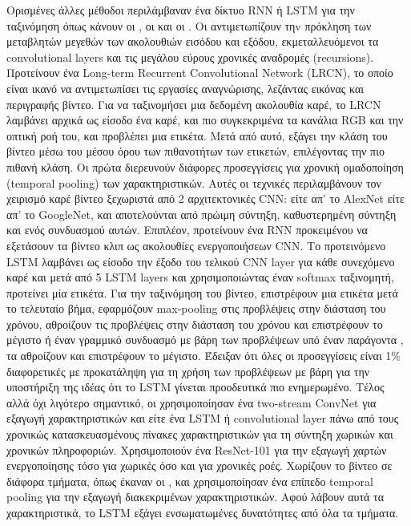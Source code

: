 Ορισμένες άλλες μέθοδοι περιλάμβαναν ένα δίκτυο \en RNN \gr  ή  \en LSTM  \gr για την ταξινόμηση όπως κάνουν οι \en\cite{DBLP:journals/corr/DonahueHGRVSD14}\gr, οι \en \cite{DBLP:journals/corr/NgHVVMT15} \gr
και οι \en \cite{DBLP:journals/corr/MaCKA17}\gr. Οι  \en \cite{DBLP:journals/corr/DonahueHGRVSD14} \gr αντιμετωπίζουν τηv  πρόκληση των μεταβλητών μεγεθών των ακολουθιών εισόδου και εξόδου,
εκμεταλλευόμενοι τα \en convolutional layers \gr  και τις μεγάλου εύρους χρονικές αναδρομές (\en recursions\gr). Προτείνουν ένα \en Long-term Recurrent
Convolutional Network (LRCN)\gr, το οποίο είναι ικανό να αντιμετωπίσει  τις εργασίες αναγνώρισης, λεζάντας εικόνας και περιγραφής βίντεο.
Για να ταξινομήσει μια δεδομένη ακολουθία καρέ, το \en LRCN \gr λαμβάνει αρχικά ως είσοδο ένα καρέ, και πιο συγκεκριμένα τα κανάλια \en RGB \gr και την οπτική ροή του, και προβλέπει μια ετικέτα.
Μετά από αυτό, εξάγει την  κλάση  του βίντεο μέσω του  μέσου όρου των πιθανοτήτων των ετικετών, επιλέγοντας την πιο πιθανή κλάση.
Οι  \en\cite{DBLP:journals/corr/NgHVVMT15}  \gr πρώτα διερευνούν  διάφορες προσεγγίσεις για χρονική ομαδοποίηση (\en temporal pooling\gr) των χαρακτηριστικών.
Αυτές οι τεχνικές περιλαμβάνουν τον χειρισμό καρέ βίντεο ξεχωριστά από 2 αρχιτεκτονικές \en  CNN\gr: είτε απ' το \en AlexNet \gr είτε απ' το \en GoogleNet\gr, και αποτελούνται από 
πρώιμη σύντηξη, καθυστερημένη σύντηξη και  ενός συνδυασμού αυτών. Επιπλέον, προτείνουν ένα \en RNN \gr προκειμένου να εξετάσουν τα βίντεο κλιπ
ως ακολουθίες ενεργοποιήσεων \en CNN\gr. Το προτεινόμενο \en LSTM \gr λαμβάνει ως είσοδο την έξοδο του τελικού \en CNN layer \gr για κάθε συνεχόμενο καρέ και μετά από 5 \en LSTM layers \gr και χρησιμοποιώντας
έναν \en softmax \gr ταξινομητή, προτείνει μία ετικέτα. Για την ταξινόμηση του βίντεο,  επιστρέφουν μια ετικέτα μετά το τελευταίο βήμα, εφαρμόζουν \en max-pooling \gr στις προβλέψεις στην διάσταση
του χρόνου, αθροίζουν τις προβλέψεις στην διάσταση του χρόνου και επιστρέφουν το μέγιστο ή έναν γραμμικό συνδυασμό με βάρη των προβλέψεων υπό έναν παράγοντα , τα αθροίζουν και επιστρέφουν το μέγιστο.
Έδειξαν ότι όλες οι προσεγγίσεις είναι 1\% διαφορετικές με προκατάληψη για τη χρήση των προβλέψεων με βάρη 
για την υποστήριξη της ιδέας ότι το \en LSTM \gr γίνεται προοδευτικά πιο ενημερωμένο. Τέλος 
αλλά όχι λιγότερο σημαντικό, οι \en \cite{DBLP:journals/corr/MaCKA17} \gr χρησιμοποίησαν ένα \en two-stream ConvNet \gr για  εξαγωγή χαρακτηριστικών και είτε ένα \en
LSTM \gr ή  \en convolutional layer \gr πάνω από τους χρονικώς κατασκευασμένους πίνακες χαρακτηριστικών για τη σύντηξη χωρικών και χρονικών πληροφοριών. Χρησιμοποιούν ένα \en ResNet-101 \gr
για την εξαγωγή χαρτών ενεργοποίησης  τόσο για χωρικές όσο και για χρονικές ροές. Χωρίζουν το 
βίντεο σε διάφορα τμήματα, όπως έκαναν οι \en \cite{DBLP:journals/corr/WangXW0LTG16}\gr, και χρησιμοποίησαν ένα επίπεδο  \en temporal pooling \gr για την εξαγωγή διακεκριμένων χαρακτηριστικών.
Αφού λάβουν αυτά τα χαρακτηριστικά, το \en LSTM  \gr
εξάγει ενσωματωμένες δυνατότητες από όλα τα τμήματα. \par


